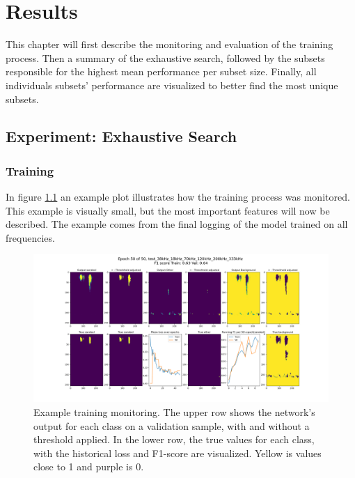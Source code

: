 \chapter{Results} \label{results}
This chapter will first describe the monitoring and evaluation of the training process. Then a summary of the exhaustive search, followed by the subsets responsible for the highest mean performance per subset size. Finally, all individuals subsets' performance are visualized to better find the most unique subsets. 

\section{Experiment: Exhaustive Search}
    
    \subsection{Training}
        In figure \ref{training_overveiw_fig} an example plot illustrates how the training process was monitored. This example is visually small, but the most important features will now be described. The example comes from the final logging of the model trained on all frequencies.
        \clearpage
        \begin{figure}[H]

            \hspace*{-3.2cm}
            \includegraphics[scale=0.45]{figures/epoch_50_test_38kHz_18kHz_70kHz_120kHz_200kHz_333kHz.png}
            \caption[Training example monitoring]{Example training monitoring. The upper row shows the network's output for each class on a validation sample, with and without a threshold applied. In the lower row, the true values for each class, with the historical loss and F1-score are visualized. Yellow is values close to 1 and purple is 0.}
          	\medskip 
            \label{training_overveiw_fig}
        \end{figure}
        
